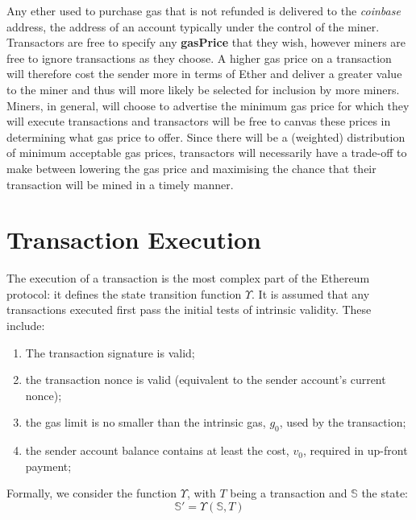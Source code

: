 \documentclass[9pt,oneside]{amsart}
\begin{document}
\begin{multicols}{2}
Any ether used to purchase gas that is not refunded is delivered to the \textit{coinbase} address, the address of an account typically under the control of the miner. Transactors are free to specify any \textbf{gasPrice} that they wish, however miners are free to ignore transactions as they choose. A higher gas price on a transaction will therefore cost the sender more in terms of Ether and deliver a greater value to the miner and thus will more likely be selected for inclusion by more miners. Miners, in general, will choose to advertise the minimum gas price for which they will execute transactions and transactors will be free to canvas these prices in determining what gas price to offer. Since there will be a (weighted) distribution of minimum acceptable gas prices, transactors will necessarily have a trade-off to make between lowering the gas price and maximising the chance that their transaction will be mined in a timely manner.


\section{Transaction Execution} \label{ch:transactions}

The execution of a transaction is the most complex part of the Ethereum protocol: it defines the state transition function $\Upsilon$. It is assumed that any transactions executed first pass the initial tests of intrinsic validity. These include:

\begin{enumerate}
\item The transaction signature is valid;
\item the transaction nonce is valid (equivalent to the sender account's current nonce);
\item the gas limit is no smaller than the intrinsic gas, $g_0$, used by the transaction;
\item the sender account balance contains at least the cost, $v_0$, required in up-front payment;
\end{enumerate}

Formally, we consider the function $\Upsilon$, with $T$ being a transaction and $\mathbb{S}$ the state:
\begin{equation}
\mathbb{S}' = \Upsilon(\mathbb{S}, T)
\end{equation}


\end{multicols}
\end{document}
